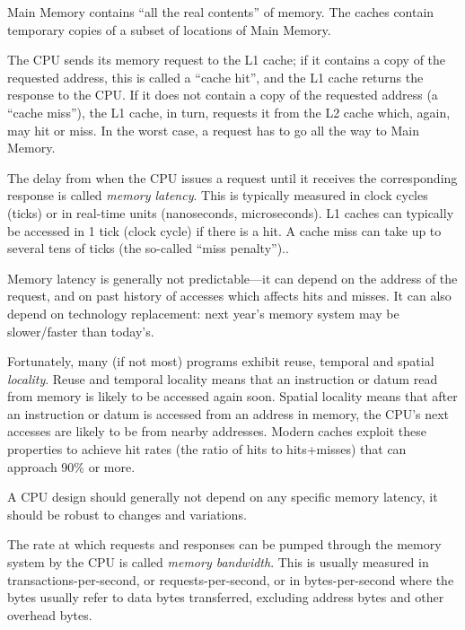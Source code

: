 Main Memory contains ``all the real contents'' of memory.  The caches
contain temporary copies of a subset of locations of Main Memory.


The CPU sends its memory request to the L1 cache; if it contains a
copy of the requested address, this is called a ``cache hit'', and the
L1 cache returns the response to the CPU.  If it does not contain a
copy of the requested address (a ``cache miss''), the L1 cache, in
turn, requests it from the L2 cache which, again, may hit or miss.  In
the worst case, a request has to go all the way to Main Memory.

\label{Sec_mem_latency}


The delay from when the CPU issues a request until it receives the
corresponding response is called \emph{memory latency}.  This is
typically measured in clock cycles (ticks) or in real-time units
(nanoseconds, microseconds).  L1 caches can typically be accessed in 1
tick (clock cycle) if there is a hit.  A cache miss can take up to
several tens of ticks (the so-called ``miss penalty'')..

Memory latency is generally not predictable---it can depend on the
address of the request, and on past history of accesses which affects
hits and misses.  It can also depend on technology replacement: next
year's memory system may be slower/faster than today's.

Fortunately, many (if not most) programs exhibit reuse, temporal and
spatial \emph{locality}. Reuse and temporal locality means that an
instruction or datum read from memory is likely to be accessed again
soon.  Spatial locality means that after an instruction or datum is
accessed from an address in memory, the CPU's next accesses are likely
to be from nearby addresses.  Modern caches exploit these properties
to achieve hit rates (the ratio of hits to hits+misses) that can
approach 90\% or more.

A CPU design should generally not depend on any specific memory
latency, {\ie} it should be robust to changes and variations.


The rate at which requests and responses can be pumped through the
memory system by the CPU is called \emph{memory bandwidth}.  This is
usually measured in transactions-per-second, or requests-per-second,
or in bytes-per-second where the bytes usually refer to data bytes
transferred, excluding address bytes and other overhead bytes.

